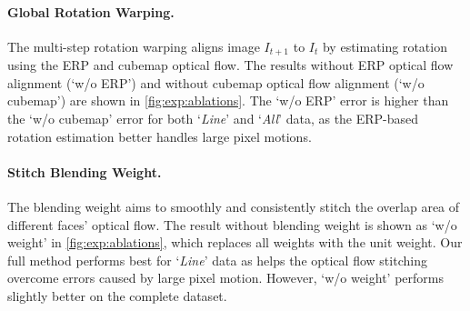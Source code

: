 \paragraph{Global Rotation Warping.}
The multi-step rotation warping aligns image $I_{t+1}$ to $I_t$ by estimating rotation using the ERP and cubemap optical flow.
The results without ERP optical flow alignment (`w/o ERP') and without cubemap optical flow alignment (`w/o cubemap') are shown in \cref{fig:exp:ablations}.
The `w/o ERP' error is higher than the `w/o cubemap' error for both `\emph{Line}' and `\emph{All}' data,
as the ERP-based rotation estimation better handles large pixel motions.


\paragraph{Stitch Blending Weight.}
The blending weight aims to smoothly and consistently stitch the overlap area of different faces' optical flow.
The result without blending weight is shown as `w/o weight' in \cref{fig:exp:ablations}, which replaces all weights with the unit weight.
Our full method performs best for `\emph{Line}' data as helps the optical flow stitching overcome errors caused by large pixel motion.
However, `w/o weight' performs slightly better on the complete dataset.


